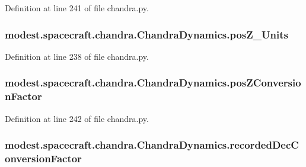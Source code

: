 Definition at line 241 of file chandra.\+py.

\subsubsection[{\texorpdfstring{pos\+Z\+\_\+\+Units}{posZ_Units}}]{\setlength{\rightskip}{0pt plus 5cm}modest.\+spacecraft.\+chandra.\+Chandra\+Dynamics.\+pos\+Z\+\_\+\+Units}\hypertarget{classmodest_1_1spacecraft_1_1chandra_1_1ChandraDynamics_a7214332454c107c6e9b1c00ecb95ab94}{}\label{classmodest_1_1spacecraft_1_1chandra_1_1ChandraDynamics_a7214332454c107c6e9b1c00ecb95ab94}


Definition at line 238 of file chandra.\+py.

\subsubsection[{\texorpdfstring{pos\+Z\+Conversion\+Factor}{posZConversionFactor}}]{\setlength{\rightskip}{0pt plus 5cm}modest.\+spacecraft.\+chandra.\+Chandra\+Dynamics.\+pos\+Z\+Conversion\+Factor}\hypertarget{classmodest_1_1spacecraft_1_1chandra_1_1ChandraDynamics_a6b3caeeb987bacaa5248bd1df37576a6}{}\label{classmodest_1_1spacecraft_1_1chandra_1_1ChandraDynamics_a6b3caeeb987bacaa5248bd1df37576a6}


Definition at line 242 of file chandra.\+py.

\subsubsection[{\texorpdfstring{recorded\+Dec\+Conversion\+Factor}{recordedDecConversionFactor}}]{\setlength{\rightskip}{0pt plus 5cm}modest.\+spacecraft.\+chandra.\+Chandra\+Dynamics.\+recorded\+Dec\+Conversion\+Factor}\hypertarget{classmodest_1_1spacecraft_1_1chandra_1_1ChandraDynamics_ab3bd27682f648ccadadc0f2ea4d94a00}{}\label{classmodest_1_1spacecraft_1_1chandra_1_1ChandraDynamics_ab3bd27682f648ccadadc0f2ea4d94a00}



